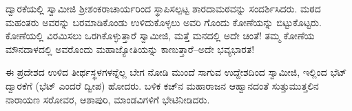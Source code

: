 ದ್ವಾರಕೆಯಲ್ಲಿ ಸ್ವಾಮೀಜಿ ಶ್ರೀಶಂಕರಾಚಾರ್ಯರಿಂದ ಸ್ಥಾಪಿಸಲ್ಪಟ್ಟ ಶಾರದಾಮಠವನ್ನು ಸಂದರ್ಶಿಸಿದರು. ಮಠದ ಮಹಂತರು ಅವರನ್ನು ಬರಮಾಡಿಕೊಂಡು ಉಳಿದುಕೊಳ್ಳಲು ಅವರಿ ಗೊಂದು ಕೋಣೆಯನ್ನು ಬಿಟ್ಟುಕೊಟ್ಟರು. ಕೋಣೆಯಲ್ಲಿ ವಿರಮಿಸಲು ಒರಗಿಕೊಳ್ಳುತ್ತಾರೆ ಸ್ವಾಮೀಜಿ, ಮತ್ತೆ ಮನದಲ್ಲಿ ಅದೇ ಚಿಂತೆ! ತಮ್ಮ ಕೋಣೆಯ ಮೌನದಾಳದಲ್ಲಿ ಅವರೊಂದು ಮಹಾಜ್ಯೋತಿಯನ್ನು ಕಾಣುತ್ತಾರೆ–ಅದೇ ಭವ್ಯಭಾರತ!

ಈ ಪ್ರದೇಶದ ಉಳಿದ ತೀರ್ಥಸ್ಥಳಗಳನ್ನೆಲ್ಲ ಬೇಗ ನೋಡಿ ಮುಂದೆ ಸಾಗುವ ಉದ್ದೇಶದಿಂದ ಸ್ವಾಮೀಜಿ, ಇಲ್ಲಿಂದ ಭೆಟ್​ದ್ವಾರಕೆಗೆ (ಭೆಟ್ ಎಂದರೆ ದ್ವೀಪ) ಹೋದರು. ಬಳಿಕ ಕಚ್​ನ ಮಹಾರಾಜನ ಆಹ್ವಾನದಂತೆ ಸುತ್ತುಮುತ್ತಲಿನ ನಾರಾಯಣ ಸರೋವರ, ಆಶಾಪುರಿ, ಮಾಂಡವಿಗಳಿಗೆ ಭೇಟಿನೀಡಿದರು.

